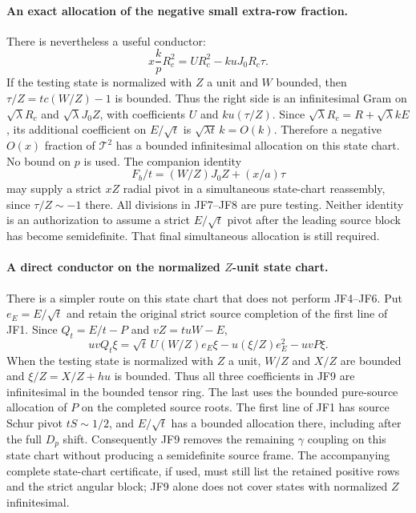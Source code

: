 \paragraph{An exact allocation of the negative small extra-row fraction.}
There is nevertheless a useful conductor:
\[
 x\frac{k}{p}R_c^2
          =U R_c^2-kuJ_0R_c\tau.                   \tag{JF7}
\]
If the testing state is normalized with $Z$ a unit and $W$ bounded,
then $\tau/Z=tc(W/Z)-1$ is bounded. Thus the right side is an
infinitesimal Gram on $\sqrt\lambda R_c$ and
$\sqrt\lambda J_0Z$, with coefficients $U$ and
$ku(\tau/Z)$. Since
$\sqrt\lambda R_c=R+\sqrt\lambda kE$, its additional coefficient
on $E/\sqrt t$ is $\sqrt{\lambda t}\,k=O(k)$.
Therefore a negative $O(x)$ fraction of $\mathcal T^2$ has a bounded
infinitesimal allocation on this state chart. No bound on $p$ is used.
The companion identity
\[
 F_b/t=(W/Z)J_0Z+(x/a)\tau                          \tag{JF8}
\]
may supply a strict $xZ$ radial pivot in a simultaneous state-chart
reassembly, since $\tau/Z\sim-1$ there. All divisions in JF7--JF8
are pure testing. Neither identity is an authorization to assume a
strict $E/\sqrt t$ pivot after the leading source block has become
semidefinite. That final simultaneous allocation is still required.

\paragraph{A direct conductor on the normalized $Z$-unit state chart.}
There is a simpler route on this state chart that does not perform JF4--JF6.
Put $e_E=E/\sqrt t$ and retain the original strict source completion
of the first line of JF1. Since $Q_t=E/t-P$ and $vZ=tuW-E$,
\[
 uvQ_t\xi=\sqrt t\,U(W/Z)e_E\xi
             -u(\xi/Z)e_E^2-uvP\xi.                \tag{JF9}
\]
When the testing state is normalized with $Z$ a unit, $W/Z$ and
$X/Z$ are bounded and $\xi/Z=X/Z+hu$ is bounded. Thus all three
coefficients in JF9 are infinitesimal in the bounded tensor ring.
The last uses the bounded pure-source allocation of $P$ on the
completed source roots. The first line of JF1 has source Schur pivot
$tS\sim1/2$, and $E/\sqrt t$ has a bounded allocation there,
including after the full $D_p$ shift. Consequently JF9 removes the
remaining $\gamma$ coupling on this state chart without producing
a semidefinite source frame.
The accompanying complete state-chart certificate, if used, must still
list the retained positive rows and the strict angular block; JF9
alone does not cover states with normalized $Z$ infinitesimal.

